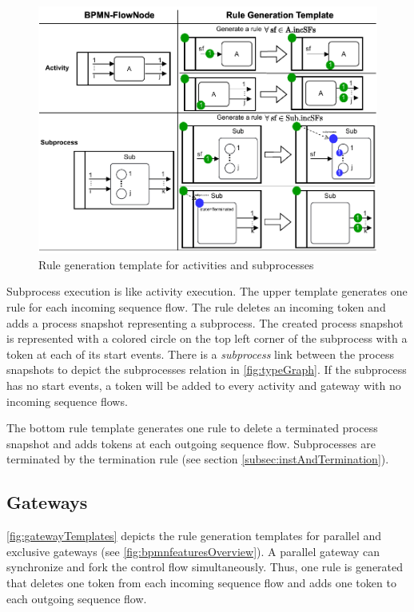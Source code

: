 \documentclass[runningheads]{llncs}
\begin{document}
\begin{figure}[ht]
    \centering
    \includegraphics[width=1\textwidth]{images/activities_template.pdf}
    \caption{Rule generation template for activities and subprocesses}
    \label{fig:activityTemplates}
\end{figure}

Subprocess execution is like activity execution.
The upper template generates one rule for each incoming sequence flow.
The rule deletes an incoming token and adds a process snapshot representing a subprocess. 
The created process snapshot is represented with a colored circle on the top left corner of the subprocess with a token at each of its start events.
There is a \textit{subprocess} link between the process snapshots to depict the \textsf{subprocesses} relation in \autoref{fig:typeGraph}.
If the subprocess has no start events, a token will be added to every activity and gateway with no incoming sequence flows.

The bottom rule template generates one rule to delete a terminated process snapshot and adds tokens at each outgoing sequence flow.
Subprocesses are terminated by the termination rule (see section \ref{subsec:instAndTermination}).


\subsection{Gateways}
\autoref{fig:gatewayTemplates} depicts the rule generation templates for parallel and exclusive gateways (see \autoref{fig:bpmnfeaturesOverview}).
A parallel gateway can synchronize and fork the control flow simultaneously.
Thus, one rule is generated that deletes one token from each incoming sequence flow and adds one token to each outgoing sequence flow.
\end{document}
